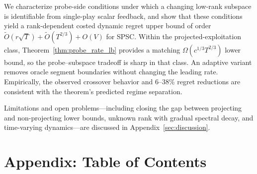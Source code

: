 \documentclass{article}
\begin{document}
We characterize probe-side conditions under which a changing low-rank subspace is identifiable from single-play
   scalar feedback, and show that these conditions yield a rank-dependent costed dynamic regret upper bound of order $\widetilde{O}(r\sqrt{T}) + \widetilde{O}(T^{2/3}) + O(V)$ for SPSC.
Within the projected-exploitation class, Theorem~\ref{thm:probe_rate_lb} provides a matching $\Omega(c^{1/3}T^{2/3})$ lower bound, so the probe--subspace tradeoff is sharp in that class.
An adaptive variant removes oracle segment boundaries without changing the leading rate.
Empirically, the observed crossover behavior and 6--38\% regret reductions are consistent with the theorem's predicted regime separation.

Limitations and open problems---including closing the gap between projecting and non-projecting lower bounds, unknown rank with gradual spectral decay, and time-varying dynamics---are discussed in Appendix~\ref{sec:discussion}.


\newpage



\newpage
\appendix

  \section*{Appendix: Table of Contents}
  \label{app:toc}

  \begingroup
  \hypersetup{linkcolor=blue}

  \newcommand{\tocentry}[3]{%
    \noindent\textbf{#1.}\;\hyperref[#2]{#3}\dotfill\hyperref[#2]{p.\,\pageref*{#2}}\par\vspace{2pt}%
  }
  \newcommand{\tocsubentry}[3]{%
    \noindent\hspace{1.2em}#1\;\hyperref[#2]{#3}\dotfill\hyperref[#2]{p.\,\pageref*{#2}}\par\vspace{1pt}%
  }
\end{document}
